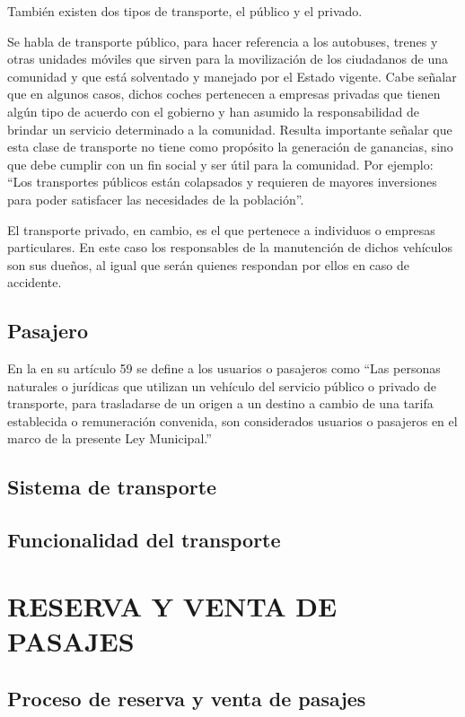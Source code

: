 		También existen dos tipos de transporte, el público y el privado.
		
		Se habla de transporte público, para hacer referencia a los autobuses, trenes y otras unidades móviles que sirven para la movilización de los ciudadanos de una comunidad y que está solventado y manejado por el Estado vigente. Cabe señalar que en algunos casos, dichos coches pertenecen a empresas privadas que tienen algún tipo de acuerdo con el gobierno y han asumido la responsabilidad de brindar un servicio determinado a la comunidad. Resulta importante señalar que esta clase de transporte no tiene como propósito la generación de ganancias, sino que debe cumplir con un fin social y ser útil para la comunidad. Por ejemplo: “Los transportes públicos están colapsados y requieren de mayores inversiones para
		poder satisfacer las necesidades de la población”.
		
		El transporte privado, en cambio, es el que pertenece a individuos o empresas particulares. En este caso los responsables de la manutención de dichos vehículos son sus dueños, al igual que serán quienes respondan por ellos en caso de
		accidente.
	\subsection{Pasajero}
		En la \textcite{ley_municipal2012transporte} en su artículo 59 se define a los usuarios o pasajeros como ``Las personas naturales o jurídicas que utilizan un vehículo del servicio público o privado de transporte, para trasladarse de un origen a un destino a cambio de una tarifa establecida o remuneración convenida, son considerados usuarios o pasajeros en el marco de la presente Ley Municipal.''
	
	\subsection{Sistema de transporte}
	\subsection{Funcionalidad del transporte}
	\section{RESERVA Y VENTA DE PASAJES}
	\subsection{Proceso de reserva y venta de pasajes}
